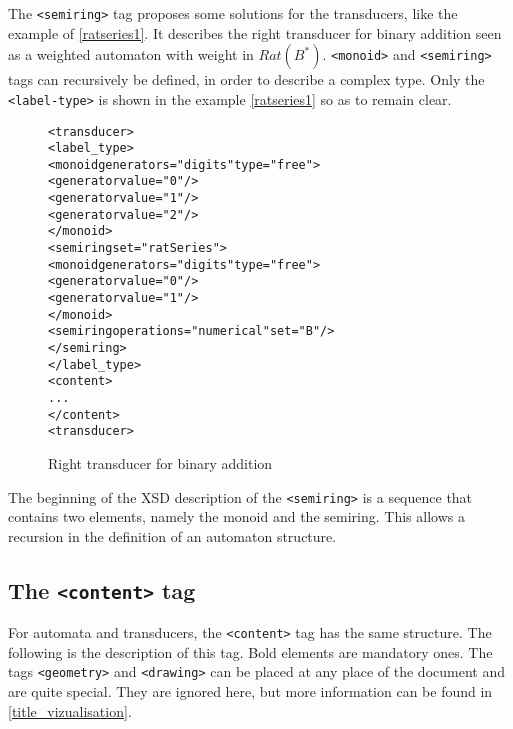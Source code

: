 \documentclass[a4paper]{article}
\def\typetag{\texttt{<label-type>}}
\def\contenttag{\texttt{<content>}}
\def\dstname{\texttt{dst}}
\def\srcname{\texttt{src}}
\def\geometrytag{\texttt{<geometry>}}
\def\drawingtag{\texttt{<drawing>}}
\def\monoidtag{\texttt{<monoid>}}
\def\semiringtag{\texttt{<semiring>}}
\begin{document}
The \semiringtag{} tag proposes some solutions for the transducers, like the
example of \autoref{ratseries1}. It describes the right transducer
for binary addition seen as a weighted automaton with
weight in $Rat(B^*)$. \monoidtag{} and \semiringtag{} tags can recursively be
defined, in order to describe a complex type. Only the \typetag{} is shown in
the example \autoref{ratseries1} so as to remain clear.

\begin{figure}[h]
  \begin{center}
\begin{alltt}
<transducer>
  <label_type>
    <monoid generators="digits" type="free">
      <generator value="0"/>
      <generator value="1"/>
      <generator value="2"/>
    </monoid>
    <semiring set="ratSeries">
      <monoid generators="digits" type="free">
        <generator value="0"/>
        <generator value="1"/>
      </monoid>
      <semiring operations="numerical" set="B"/>
    </semiring>
  </label_type>
  <content>
    ...
  </content>
<transducer>
\end{alltt}

\caption{Right transducer for binary addition}
\label{ratseries1}
  \end{center}
\end{figure}

The beginning of the XSD description of the \semiringtag{} is a sequence that
contains two elements, namely the monoid and the semiring. This allows a
recursion in the definition of an automaton structure.


\subsection{The \contenttag{} tag}

For automata and transducers, the \contenttag{} tag has the same structure.
The following is the description of this tag. Bold elements are mandatory ones.
The tags \geometrytag{} and \drawingtag{} can be placed at any
place of the document and are quite special. They are ignored here, but more
information can be found in \autoref{title_vizualisation}.\\\\
\end{document}
